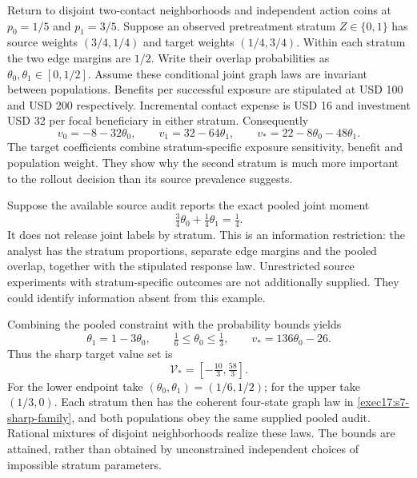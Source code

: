 Return to disjoint two-contact neighborhoods and independent action coins at
$p_0=1/5$ and $p_1=3/5$. Suppose an observed pretreatment stratum $Z\in\{0,1\}$
has source weights $(3/4,1/4)$ and target weights $(1/4,3/4)$. Within each
stratum the two edge margins are $1/2$. Write their overlap probabilities
as $\theta_0,\theta_1\in[0,1/2]$. Assume these conditional joint graph laws
are invariant between populations. Benefits per successful exposure are
stipulated at USD 100 and USD 200 respectively. Incremental contact expense
is USD 16 and investment USD 32 per focal beneficiary in either stratum.
Consequently
\begin{equation}
 v_0=-8-32\theta_0,\qquad v_1=32-64\theta_1,
 \qquad v_*=22-8\theta_0-48\theta_1.
 \label{exec17:s7-stratum-values}
\end{equation}
The target coefficients combine stratum-specific exposure sensitivity,
benefit and population weight. They show why the second stratum is much more
important to the rollout decision than its source prevalence suggests.

Suppose the available source audit reports the exact pooled joint moment
\begin{equation}
 \tfrac34\theta_0+\tfrac14\theta_1=\tfrac14.
 \label{exec17:s7-pooled-constraint}
\end{equation}
It does not release joint labels by stratum. This is an information restriction:
the analyst has the stratum proportions, separate edge margins and the pooled
overlap, together with the stipulated response law. Unrestricted source
experiments with stratum-specific outcomes are not additionally supplied.
They could identify information absent from this example.

Combining the pooled constraint with the probability bounds yields
\begin{equation}
 \theta_1=1-3\theta_0,\qquad
 \tfrac16\leq\theta_0\leq\tfrac13,
 \qquad v_*=136\theta_0-26.
 \label{exec17:s7-pooled-reduction}
\end{equation}
Thus the sharp target value set is
\begin{equation}
 \mathcal V_*=[-\tfrac{10}{3},\tfrac{58}{3}].
 \label{exec17:s7-pooled-set}
\end{equation}
For the lower endpoint take $(\theta_0,\theta_1)=(1/6,1/2)$; for the upper
take $(1/3,0)$. Each stratum then has the coherent four-state graph law in
\eqref{exec17:s7-sharp-family}, and both populations obey the same supplied
pooled audit. Rational mixtures of disjoint neighborhoods realize these laws.
The bounds are attained, rather than obtained by unconstrained independent
choices of impossible stratum parameters.\citep{exec17_s7_math}

